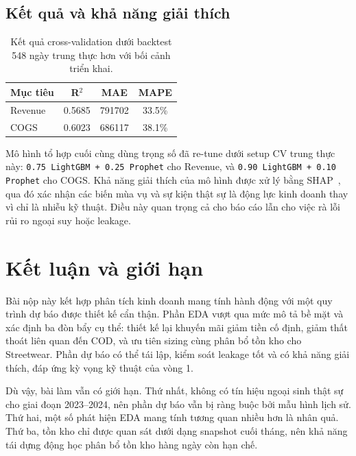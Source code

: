 \documentclass[10pt,twocolumn]{article}
\begin{document}
\subsection{Kết quả và khả năng giải thích}
\begin{table}[t]
  \centering
  \caption{Kết quả cross-validation dưới backtest 548 ngày trung thực hơn với bối cảnh triển khai.}
  \label{tab:forecast}
  \small
  \begin{tabular}{lccc}
    \toprule
    Mục tiêu & R$^2$ & MAE & MAPE \\
    \midrule
    Revenue & 0.5685 & \num{791702} & 33.5\% \\
    COGS & 0.6023 & \num{686117} & 38.1\% \\
    \bottomrule
  \end{tabular}
\end{table}

Mô hình tổ hợp cuối cùng dùng trọng số đã re-tune dưới setup CV trung thực này: \texttt{0.75 LightGBM + 0.25 Prophet} cho Revenue, và \texttt{0.90 LightGBM + 0.10 Prophet} cho COGS. Khả năng giải thích của mô hình được xử lý bằng SHAP~\citep{lundberg2017unified}, qua đó xác nhận các biến mùa vụ và sự kiện thật sự là động lực kinh doanh thay vì chỉ là nhiễu kỹ thuật. Điều này quan trọng cả cho báo cáo lẫn cho việc rà lỗi rủi ro ngoại suy hoặc leakage.

\section{Kết luận và giới hạn}
Bài nộp này kết hợp phân tích kinh doanh mang tính hành động với một quy trình dự báo được thiết kế cẩn thận. Phần EDA vượt qua mức mô tả bề mặt và xác định ba đòn bẩy cụ thể: thiết kế lại khuyến mãi giảm tiền cố định, giảm thất thoát liên quan đến COD, và ưu tiên sizing cùng phân bổ tồn kho cho Streetwear. Phần dự báo có thể tái lập, kiểm soát leakage tốt và có khả năng giải thích, đáp ứng kỳ vọng kỹ thuật của vòng 1.

Dù vậy, bài làm vẫn có giới hạn. Thứ nhất, không có tín hiệu ngoại sinh thật sự cho giai đoạn 2023--2024, nên phần dự báo vẫn bị ràng buộc bởi mẫu hình lịch sử. Thứ hai, một số phát hiện EDA mang tính tương quan nhiều hơn là nhân quả. Thứ ba, tồn kho chỉ được quan sát dưới dạng snapshot cuối tháng, nên khả năng tái dựng động học phân bổ tồn kho hàng ngày còn hạn chế.



\end{document}
